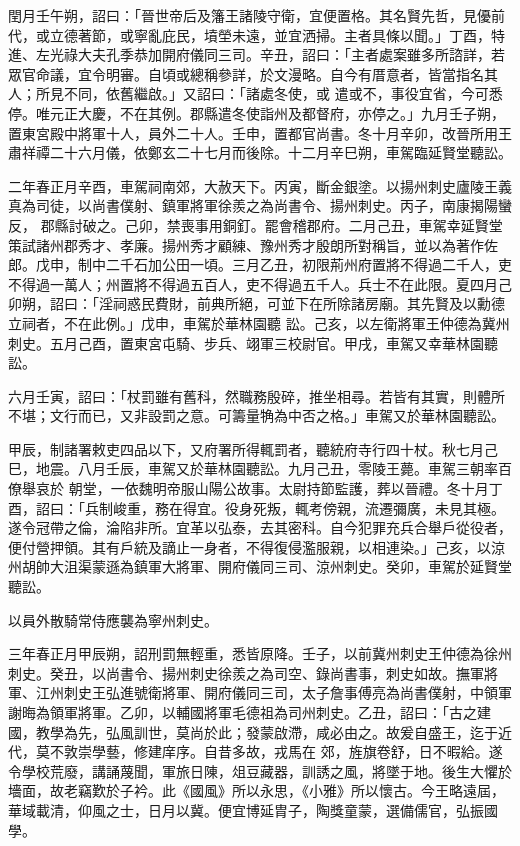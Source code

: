 \begin{pinyinscope}
 閏月壬午朔，詔曰：「晉世帝后及籓王諸陵守衛，宜便置格。其名賢先哲，見優前代，或立德著節，或寧亂庇民，墳塋未遠，並宜洒掃。主者具條以聞。」丁酉，特進、左光祿大夫孔季恭加開府儀同三司。辛丑，詔曰：「主者處案雖多所諮詳，若眾官命議，宜令明審。自頃或總稱參詳，於文漫略。自今有厝意者，皆當指名其人；所見不同，依舊繼啟。」又詔曰：「諸處冬使，或
 遣或不，事役宜省，今可悉停。唯元正大慶，不在其例。郡縣遣冬使詣州及都督府，亦停之。」九月壬子朔，置東宮殿中將軍十人，員外二十人。壬申，置都官尚書。冬十月辛卯，改晉所用王肅祥禫二十六月儀，依鄭玄二十七月而後除。十二月辛巳朔，車駕臨延賢堂聽訟。



 二年春正月辛酉，車駕祠南郊，大赦天下。丙寅，斷金銀塗。以揚州刺史廬陵王義真為司徒，以尚書僕射、鎮軍將軍徐羨之為尚書令、揚州刺史。丙子，南康揭陽蠻反，
 郡縣討破之。己卯，禁喪事用銅釘。罷會稽郡府。二月己丑，車駕幸延賢堂策試諸州郡秀才、孝廉。揚州秀才顧練、豫州秀才殷朗所對稱旨，並以為著作佐郎。戊申，制中二千石加公田一頃。三月乙丑，初限荊州府置將不得過二千人，吏不得過一萬人；州置將不得過五百人，吏不得過五千人。兵士不在此限。夏四月己卯朔，詔曰：「淫祠惑民費財，前典所絕，可並下在所除諸房廟。其先賢及以勳德立祠者，不在此例。」戊申，車駕於華林園聽
 訟。己亥，以左衛將軍王仲德為冀州刺史。五月己酉，置東宮屯騎、步兵、翊軍三校尉官。甲戌，車駕又幸華林園聽訟。



 六月壬寅，詔曰：「杖罰雖有舊科，然職務殷碎，推坐相尋。若皆有其實，則體所不堪；文行而已，又非設罰之意。可籌量觕為中否之格。」車駕又於華林園聽訟。



 甲辰，制諸署敕吏四品以下，又府署所得輒罰者，聽統府寺行四十杖。秋七月己巳，地震。八月壬辰，車駕又於華林園聽訟。九月己丑，零陵王薨。車駕三朝率百僚舉哀於
 朝堂，一依魏明帝服山陽公故事。太尉持節監護，葬以晉禮。冬十月丁酉，詔曰：「兵制峻重，務在得宜。役身死叛，輒考傍親，流遷彌廣，未見其極。遂令冠帶之倫，淪陷非所。宜革以弘泰，去其密科。自今犯罪充兵合舉戶從役者，便付營押領。其有戶統及謫止一身者，不得復侵濫服親，以相連染。」己亥，以涼州胡帥大沮渠蒙遜為鎮軍大將軍、開府儀同三司、涼州刺史。癸卯，車駕於延賢堂聽訟。



 以員外散騎常侍應襲為寧州刺史。



 三年春正月甲辰朔，詔刑罰無輕重，悉皆原降。壬子，以前冀州刺史王仲德為徐州刺史。癸丑，以尚書令、揚州刺史徐羨之為司空、錄尚書事，刺史如故。撫軍將軍、江州刺史王弘進號衛將軍、開府儀同三司，太子詹事傅亮為尚書僕射，中領軍謝晦為領軍將軍。乙卯，以輔國將軍毛德祖為司州刺史。乙丑，詔曰：「古之建國，教學為先，弘風訓世，莫尚於此；發蒙啟滯，咸必由之。故爰自盛王，迄于近代，莫不敦崇學藝，修建庠序。自昔多故，戎馬在
 郊，旌旗卷舒，日不暇給。遂令學校荒廢，講誦蔑聞，軍旅日陳，俎豆藏器，訓誘之風，將墜于地。後生大懼於墻面，故老竊歎於子衿。此《國風》所以永思，《小雅》所以懷古。今王略遠屆，華域載清，仰風之士，日月以冀。便宜博延胄子，陶獎童蒙，選備儒官，弘振國學。




\end{pinyinscope}
